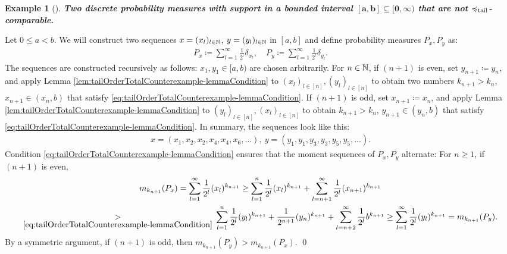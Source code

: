 \documentclass[a4paper,DIV=11,abstracton,twoside=semi]{scrreprt}
\theoremstyle{definition}
\newtheorem{ex}[thm]{Example} %
\begin{document}
    \begin{ex}[{\cite{bib:epperleinTailOrderTotalCounterexample}}]
        \textbf{\textsl{Two discrete probability measures with support in a bounded interval $\mathbf{\boldsymbol{[a, b] \subseteq [0, \infty)}}$ that are not $\preccurlyeq_{\text{tail}}$-comparable}.}
        
        Let $0 \leq a < b$.
        We will construct two sequences $x = (x_l)_{l \in \mathbb{N}}$, $y = (y_l)_{l \in \mathbb{N}}$ in $[a, b]$ and define probability measures $P_x, P_y$ as:
        \begin{gather*}
            P_x \coloneqq \sum_{l=1}^{\infty} \frac{1}{2^l} \delta_{x_l}, \quad
            P_y \coloneqq \sum_{l=1}^{\infty} \frac{1}{2^l} \delta_{y_l}.
        \end{gather*}
        The sequences are constructed recursively as follows: $x_1, y_1 \in [a, b)$ are chosen arbitrarily.
        For $n \in \mathbb{N}$, if $(n+1)$ is even, set $y_{n+1} \coloneqq y_n$, and apply Lemma \ref{lem:tailOrderTotalCounterexample-lemmaCondition} to $(x_l)_{l \in [n]}, (y_l)_{l \in [n]}$ to obtain two numbers $k_{n+1} > k_n$, $x_{n+1} \in (x_n, b)$ that satisfy \eqref{eq:tailOrderTotalCounterexample-lemmaCondition}.
        If $(n+1)$ is odd, set $x_{n+1} \coloneqq x_n$, and apply Lemma \ref{lem:tailOrderTotalCounterexample-lemmaCondition} to $(y_l)_{l \in [n]}, (x_l)_{l \in [n]}$ to obtain $k_{n+1} > k_n$, ${y_{n+1} \in (y_n, b)}$ that satisfy \eqref{eq:tailOrderTotalCounterexample-lemmaCondition}.
        In summary, the sequences look like this:
        \begin{gather*}
            x = (x_1, x_2, x_2, x_4, x_4, x_6, \dots),~ y = (y_1, y_1, y_3, y_3, y_5, y_5, \dots).
        \end{gather*}
        Condition \eqref{eq:tailOrderTotalCounterexample-lemmaCondition} ensures that the moment sequences of $P_x, P_y$ alternate: For $n \geq 1$, if $(n + 1)$ is even,
        \begin{multline*}
            m_{k_{n+1}}(P_x) 
            = \sum_{l=1}^{\infty} \frac{1}{2^l} (x_l)^{k_{n+1}}
            \geq  \sum_{l=1}^{n} \frac{1}{2^l} (x_l)^{k_{n+1}} + \sum_{l = n+1}^{\infty} \frac{1}{2^l} (x_{n+1})^{k_{n+1}} \\
            \underset{\eqref{eq:tailOrderTotalCounterexample-lemmaCondition}}
            {>}\, \sum_{l=1}^{n} \frac{1}{2^l} (y_l)^{k_{n+1}} + \frac{1}{2^{n+1}} (y_n)^{k_{n+1}} + \sum_{l = n+2}^{\infty} \frac{1}{2^l} b^{k_{n+1}}
            \geq \sum_{l=1}^{\infty} \frac{1}{2^l} (y_l)^{k_{n+1}}
            = m_{k_{n+1}}(P_y).
        \end{multline*}
        By a symmetric argument, if $(n+1)$ is odd, then $m_{k_{n+1}}(P_y) > m_{k_{n+1}}(P_x)$.
        \qed
    \end{ex}
    
\end{document}
